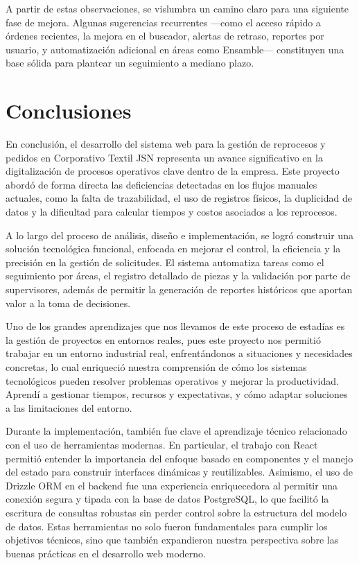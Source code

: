 \documentclass[12pt,letterpaper,spanish]{report}
\begin{document}
A partir de estas observaciones, se vislumbra un camino claro para una siguiente fase de mejora. Algunas sugerencias recurrentes —como el acceso rápido a órdenes recientes, la mejora en el buscador, alertas de retraso, reportes por usuario, y automatización adicional en áreas como Ensamble— constituyen una base sólida para plantear un seguimiento a mediano plazo. 


\section{Conclusiones}

En conclusión, el desarrollo del sistema web para la gestión de reprocesos y pedidos en Corporativo Textil JSN representa un avance significativo en la digitalización de procesos operativos clave dentro de la empresa. Este proyecto abordó de forma directa las deficiencias detectadas en los flujos manuales actuales, como la falta de trazabilidad, el uso de registros físicos, la duplicidad de datos y la dificultad para calcular tiempos y costos asociados a los reprocesos.

A lo largo del proceso de análisis, diseño e implementación, se logró construir una solución tecnológica funcional, enfocada en mejorar el control, la eficiencia y la precisión en la gestión de solicitudes. El sistema automatiza tareas como el seguimiento por áreas, el registro detallado de piezas y la validación por parte de supervisores, además de permitir la generación de reportes históricos que aportan valor a la toma de decisiones.


Uno de los grandes aprendizajes que nos llevamos de este proceso de estadías es la gestión de proyectos en entornos reales, pues este proyecto nos permitió trabajar en un entorno industrial real, enfrentándonos a situaciones y necesidades concretas, lo cual enriqueció nuestra comprensión de cómo los sistemas tecnológicos pueden resolver problemas operativos y mejorar la productividad. Aprendí a gestionar tiempos, recursos y expectativas, y cómo adaptar soluciones a las limitaciones del entorno.

Durante la implementación, también fue clave el aprendizaje técnico relacionado con el uso de herramientas modernas. En particular, el trabajo con React permitió entender la importancia del enfoque basado en componentes y el manejo del estado para construir interfaces dinámicas y reutilizables. Asimismo, el uso de Drizzle ORM en el backend fue una experiencia enriquecedora al permitir una conexión segura y tipada con la base de datos PostgreSQL, lo que facilitó la escritura de consultas robustas sin perder control sobre la estructura del modelo de datos. Estas herramientas no solo fueron fundamentales para cumplir los objetivos técnicos, sino que también expandieron nuestra perspectiva sobre las buenas prácticas en el desarrollo web moderno.
\end{document}
